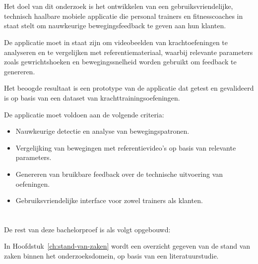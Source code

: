 \section{}%
\label{sec:onderzoeksdoelstelling}

Het doel van dit onderzoek is het ontwikkelen van een gebruiksvriendelijke, \mbox{technisch} haalbare mobiele applicatie die personal trainers en fitnesscoaches in staat stelt om nauwkeurige bewegingsfeedback te geven aan hun klanten. 

\medskip

De applicatie moet in staat zijn om videobeelden van krachtoefeningen te analyseren en te vergelijken met referentiemateriaal, waarbij relevante parameters zoals gewrichtshoeken en bewegingssnelheid worden gebruikt om feedback te genereren.

\medskip

Het beoogde resultaat is een prototype van de applicatie dat getest en gevalideerd is op basis van een dataset van krachttrainingsoefeningen. 

\medskip

De applicatie moet voldoen aan de volgende criteria:
\begin{itemize}
    \item Nauwkeurige detectie en analyse van bewegingspatronen.
    \item Vergelijking van bewegingen met referentievideo’s op basis van relevante parameters.
    \item Genereren van bruikbare feedback over de technische uitvoering van oefeningen.
    \item Gebruiksvriendelijke interface voor zowel trainers als klanten.
\end{itemize}

\section{}%
\label{sec:opzet-bachelorproef}


De rest van deze bachelorproef is als volgt opgebouwd:

In Hoofdstuk~\ref{ch:stand-van-zaken} wordt een overzicht gegeven van de stand van zaken binnen het onderzoeksdomein, op basis van een literatuurstudie.

